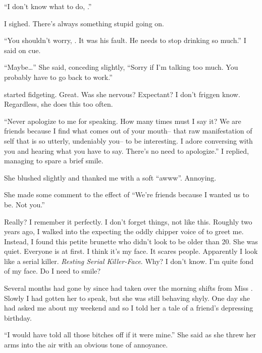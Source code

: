 ``I don't know what to do, \josh.''
\VV


\noindent
I sighed.  There's always something stupid going on.
\VV


``You shouldn't worry, \april.  It was his fault.
He needs to stop drinking so much.'' I said on cue.


``Maybe\ldots{}'' She said, conceding slightly,
``Sorry if I'm talking too much.  You probably have to go back to work.''
\VV


\noindent
\april{} started fidgeting.  Great.  Was she nervous?  Expectant?
I don't friggen know.  Regardless, she does this too often.
\VV


``Never apologize to me for speaking.  How many times must I say it?
We are friends because I find what comes out of your mouth--
that raw manifestation of self that is so utterly, undeniably you--
to be interesting.
I adore conversing with you and hearing what you have to say.
There's no need to apologize.''
I replied, managing to spare a brief smile.
\VV


\noindent
She blushed slightly and thanked me with a soft ``awww''.  Annoying.


\noindent
She made some comment to the effect of
``We're friends because I wanted us to be.  Not you.''


\noindent
Really?  I remember it perfectly.  I don't forget things, not like this.
Roughly two years ago, I walked into the \cafe{} expecting the oddly chipper
voice of \emma{} to greet me.  Instead, I found this petite brunette who didn't
look to be older than 20.  She was quiet.  Everyone is at first.
I think it's my face.  It scares people.
Apparently I look like a serial killer.
\textit{Resting Serial Killer-Face}.
Why? I don't know.  I'm quite fond of my face.  Do I need to smile?


Several months had gone by since \april{} had taken over the morning shifts from
Miss \emma.  Slowly I had gotten her to speak, but she was still behaving
shyly.  One day she had asked me about my weekend and so I told her a tale
of a friend's depressing birthday.
\VV


``I would have told all those bitches off if it were mine.''
She said as she threw her arms into the air with an obvious tone of annoyance.
\VV


